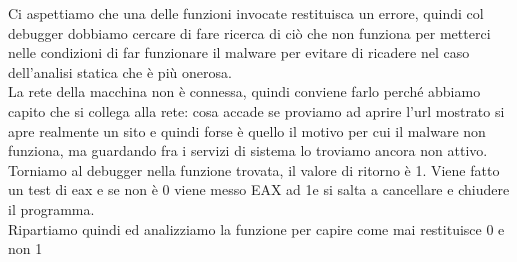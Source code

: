 \documentclass[12pt, oneside]{extbook}
\begin{document}
Ci aspettiamo che una delle funzioni invocate restituisca un errore, quindi col debugger dobbiamo cercare di fare ricerca di ciò che non funziona per metterci nelle condizioni di far funzionare il malware per evitare di ricadere nel caso dell'analisi statica che è più onerosa.\\La rete della macchina non è connessa, quindi conviene farlo perché abbiamo capito che si collega alla rete: cosa accade se proviamo ad aprire l'url mostrato si apre realmente un sito e quindi forse è quello il motivo per cui il malware non funziona, ma guardando fra i servizi di sistema lo troviamo ancora non attivo.\\Torniamo al debugger nella funzione trovata, il valore di ritorno è 1. Viene fatto un test di eax e se non è 0 viene messo EAX ad 1e si salta a cancellare e chiudere il programma.\\Ripartiamo quindi ed analizziamo la funzione per capire come mai restituisce 0 e non 1
\end{document}
